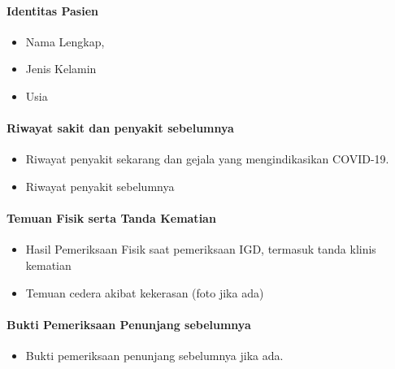 \documentclass[
]{book}
\providecommand{\tightlist}{%
  \setlength{\itemsep}{0pt}\setlength{\parskip}{0pt}}
\begin{document}
\hypertarget{identitas-pasien-4}{%
\paragraph{Identitas Pasien}\label{identitas-pasien-4}}

\begin{itemize}
\item
  Nama Lengkap,
\item
  Jenis Kelamin
\item
  Usia
\end{itemize}

\hypertarget{riwayat-sakit-dan-penyakit-sebelumnya-1}{%
\paragraph{Riwayat sakit dan penyakit sebelumnya}\label{riwayat-sakit-dan-penyakit-sebelumnya-1}}

\begin{itemize}
\item
  Riwayat penyakit sekarang dan gejala yang mengindikasikan COVID-19.
\item
  Riwayat penyakit sebelumnya
\end{itemize}

\hypertarget{temuan-fisik-serta-tanda-kematian-1}{%
\paragraph{Temuan Fisik serta Tanda Kematian}\label{temuan-fisik-serta-tanda-kematian-1}}

\begin{itemize}
\tightlist
\item
  Hasil Pemeriksaan Fisik saat pemeriksaan IGD, termasuk tanda klinis kematian
\item
  Temuan cedera akibat kekerasan (foto jika ada)
\end{itemize}

\hypertarget{bukti-pemeriksaan-penunjang-sebelumnya-4}{%
\paragraph{Bukti Pemeriksaan Penunjang sebelumnya}\label{bukti-pemeriksaan-penunjang-sebelumnya-4}}

\begin{itemize}
\tightlist
\item
  Bukti pemeriksaan penunjang sebelumnya jika ada.
\end{itemize}
\end{document}
